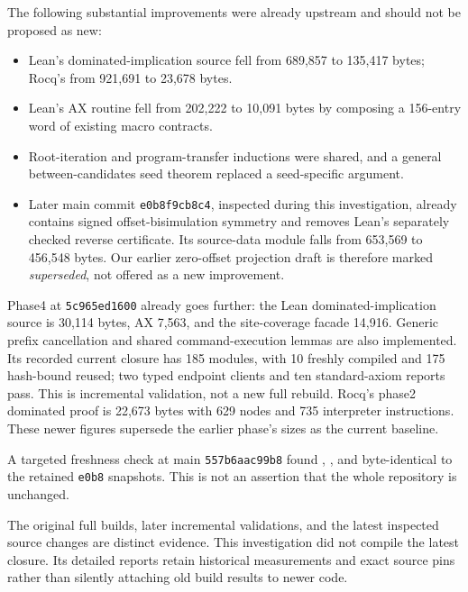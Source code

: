 \documentclass[11pt]{article}
\newcommand{\file}[1]{{\small\path{#1}}}
\begin{document}
The following substantial improvements were already upstream and should not be proposed as new:
\begin{itemize}
\item Lean's dominated-implication source fell from 689,857 to 135,417 bytes; Rocq's from 921,691 to 23,678 bytes.
\item Lean's AX routine fell from 202,222 to 10,091 bytes by composing a 156-entry word of existing macro contracts.
\item Root-iteration and program-transfer inductions were shared, and a general between-candidates seed theorem replaced a seed-specific argument.
\item Later main commit \texttt{e0b8f9cb8c4}, inspected during this investigation, already contains signed offset-bisimulation symmetry and removes Lean's separately checked reverse certificate. Its source-data module falls from 653,569 to 456,548 bytes. Our earlier zero-offset projection draft is therefore marked \emph{superseded}, not offered as a new improvement.
\end{itemize}
Phase4 at \texttt{5c965ed1600} already goes further: the Lean dominated-implication source is 30,114 bytes, AX 7,563, and the site-coverage facade 14,916. Generic prefix cancellation and shared command-execution lemmas are also implemented. Its recorded current closure has 185 modules, with 10 freshly compiled and 175 hash-bound reused; two typed endpoint clients and ten standard-axiom reports pass. This is incremental validation, not a new full rebuild. Rocq's phase2 dominated proof is 22,673 bytes with 629 nodes and 735 interpreter instructions. These newer figures supersede the earlier phase's sizes as the current baseline.

A targeted freshness check at main \texttt{557b6aac99b8} found \file{KSource215}, \file{KSites215Batch000}, and \file{EnumPerm} byte-identical to the retained \texttt{e0b8} snapshots. This is not an assertion that the whole repository is unchanged.

The original full builds, later incremental validations, and the latest inspected source changes are distinct evidence. This investigation did not compile the latest closure. Its detailed reports retain historical measurements and exact source pins rather than silently attaching old build results to newer code.
\end{document}
